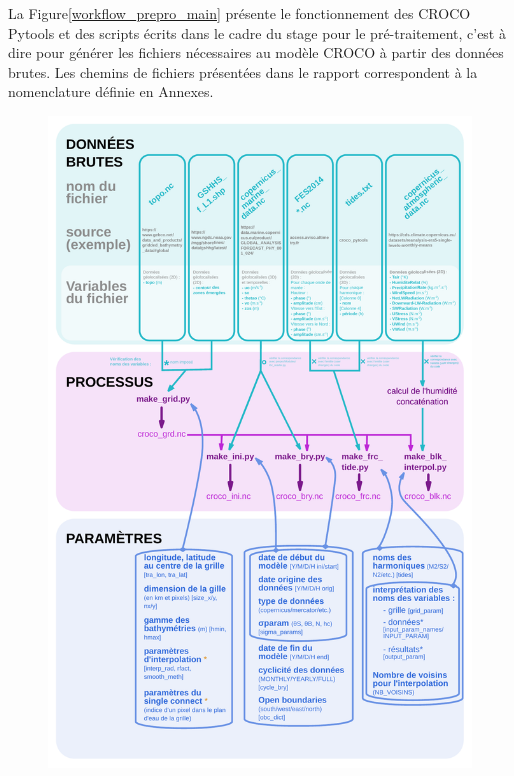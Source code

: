 \documentclass[10pt,a4paper,titlepage]{article}
\begin{document}
La Figure\ref{workflow_prepro_main} présente le fonctionnement des CROCO Pytools et des scripts écrits dans le cadre du stage pour le pré-traitement, c'est à dire pour générer les fichiers nécessaires au modèle CROCO à partir des données brutes.
Les chemins de fichiers présentées dans le rapport correspondent à la nomenclature définie en Annexes.
\begin{figure}[h]
    \begin{center}
        \includegraphics[scale=0.35]{../images/workflow/graphe_data_process_mere.pdf}

\end{center}
\end{figure}
\end{document}
